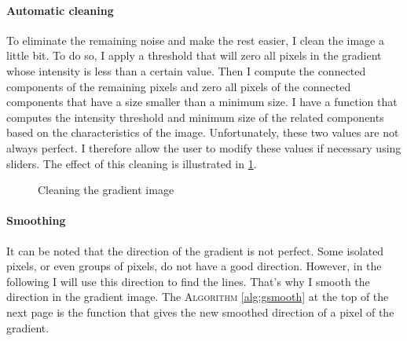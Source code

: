 \documentclass[11pt]{article}
\begin{document}
	\paragraph{Automatic cleaning}
	To eliminate the remaining noise and make the rest easier, I clean the image a little bit. To do so, I apply a threshold that will zero all pixels in the gradient whose intensity is less than a certain value. Then I compute the connected components of the remaining pixels and zero all pixels of the connected components that have a size smaller than a minimum size. I have a function that computes the intensity threshold and minimum size of the related components based on the characteristics of the image. Unfortunately, these two values are not always perfect. I therefore allow the user to modify these values if necessary using sliders. The effect of this cleaning is illustrated in \figurename \ref{im:clean}.
	
	\begin{figure}[h]
		\centering
		\vspace{-1mm}
		\caption{Cleaning the gradient image}
		\label{im:clean}
	\end{figure}

	\paragraph{Smoothing}
	It can be noted that the direction of the gradient is not perfect. Some isolated pixels, or even groups of pixels, do not have a good direction. However, in the following I will use this direction to find the lines. That's why I smooth the direction in the gradient image. The \textsc{Algorithm} \ref{alg:gsmooth} at the top of the next page is the function that gives the new smoothed direction of a pixel of the gradient.
	
\end{document}
